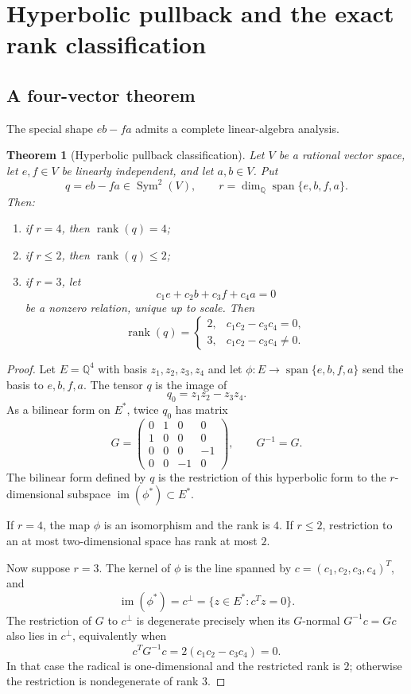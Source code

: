 \documentclass[11pt]{article}
\newtheorem{theorem}{Theorem}[section]
\theoremstyle{definition}
\theoremstyle{remark}
\newcommand{\Q}{\mathbb{Q}}
\newcommand{\Span}{\operatorname{span}}
\newcommand{\rank}{\operatorname{rank}}
\newcommand{\Sym}{\operatorname{Sym}}
\begin{document}
\section{Hyperbolic pullback and the exact rank classification}
\label{sec:hyperbolic}

\subsection{A four-vector theorem}

The special shape $eb-fa$ admits a complete linear-algebra analysis.

\begin{theorem}[Hyperbolic pullback classification]
\label{thm:hyperbolic-classification}
Let $V$ be a rational vector space, let $e,f\in V$ be linearly independent, and let
$a,b\in V$.  Put
\[
 q=eb-fa\in\Sym^2(V),
 \qquad
 r=\dim_{\Q}\Span\{e,b,f,a\}.
\]
Then:
\begin{enumerate}[label=\textup{(\roman*)}]
\item if $r=4$, then $\rank(q)=4$;
\item if $r\le2$, then $\rank(q)\le2$;
\item if $r=3$, let
\begin{equation}
 c_1e+c_2b+c_3f+c_4a=0
 \label{eq:unique-relation}
\end{equation}
be a nonzero relation, unique up to scale.  Then
\[
 \rank(q)=
 \begin{cases}
 2,&c_1c_2-c_3c_4=0,\\
 3,&c_1c_2-c_3c_4\ne0.
 \end{cases}
\]
\end{enumerate}
\end{theorem}

\begin{proof}
Let $E=\Q^4$ with basis $z_1,z_2,z_3,z_4$ and let
$\phi:E\to\Span\{e,b,f,a\}$ send the basis to $e,b,f,a$.  The tensor $q$ is the image of
\[
 q_0=z_1z_2-z_3z_4.
\]
As a bilinear form on $E^*$, twice $q_0$ has matrix
\[
 G=
 \begin{pmatrix}
 0&1&0&0\\
 1&0&0&0\\
 0&0&0&-1\\
 0&0&-1&0
 \end{pmatrix},
 \qquad G^{-1}=G.
\]
The bilinear form defined by $q$ is the restriction of this hyperbolic form to the
$r$-dimensional subspace $\operatorname{im}(\phi^*)\subset E^*$.

If $r=4$, the map $\phi$ is an isomorphism and the rank is $4$.  If $r\le2$, restriction to
an at most two-dimensional space has rank at most $2$.

Now suppose $r=3$.  The kernel of $\phi$ is the line spanned by
$c=(c_1,c_2,c_3,c_4)^T$, and
\[
 \operatorname{im}(\phi^*)=c^\perp
 =\{z\in E^*:c^Tz=0\}.
\]
The restriction of $G$ to $c^\perp$ is degenerate precisely when its $G$-normal
$G^{-1}c=Gc$ also lies in $c^\perp$, equivalently when
\[
 c^TG^{-1}c=2(c_1c_2-c_3c_4)=0.
\]
In that case the radical is one-dimensional and the restricted rank is $2$; otherwise the
restriction is nondegenerate of rank $3$.
\end{proof}
\end{document}
